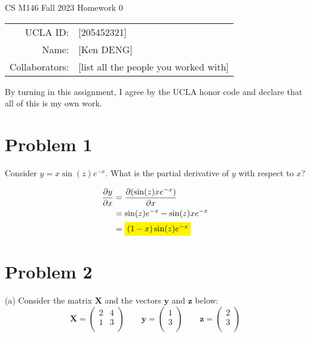 \documentclass[12pt]{article}
\begin{document}
\begin{center}
{\Large CS M146 Fall 2023 Homework 0}

\vspace{0.5em}

\begin{tabular}{rl}
UCLA ID: & [205452321] \\
Name: & [Ken DENG] \\
Collaborators: & [list all the people you worked with]
\end{tabular}
\end{center}

By turning in this assignment, I agree by the UCLA honor code and declare
that all of this is my own work.

\section*{Problem 1}

Consider $y = x \sin(z)e^{-x}$. What is the partial derivative of $y$ with respect to $x$?

\begin{align*}
\dfrac{\partial y}{\partial x} &= \dfrac{\partial(\sin(z)xe^{-x})}{\partial x}\\
&= \sin(z)e^{-x} - \sin(z)xe^{-x}\\
&= \colorbox{yellow}{$(1-x)\sin(z)e^{-x}$}
\end{align*}

\section*{Problem 2}

(a) Consider the matrix $\mathbf{X}$ and the vectors $\mathbf{y}$ and $\mathbf{z}$ below:
$$\mathbf{X} =    \begin{pmatrix}  2 & 4 \\ 1 & 3 \\ \end{pmatrix} \qquad \mathbf{y} =  \begin{pmatrix}  1 \\ 3 \\ \end{pmatrix} \qquad \mathbf{z} =  \begin{pmatrix}  2 \\ 3 \\ \end{pmatrix}$$
  
\vspace{1em}
\end{document}
